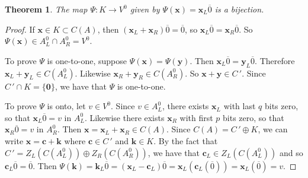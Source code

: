 \documentclass[12pt,twoside,singlespace]{article}
\numberwithin{equation}{section}
\newtheorem{thm}[equation]{Theorem}
\theoremstyle{definition}
\renewcommand{\vec}[1]{\mathbf{#1}}
\begin{document}
\begin{thm}
\label{thm:kv0}
The map $\Psi:K\to V^0$
given by $\Psi(\vec{x})=\vec{x}_L\overline{0}$ is a bijection.
\end{thm}
\begin{proof}
If $\vec{x}\in K\subset C(A)$, then $(\vec{x}_L+\vec{x}_R)\overline{0}=\overline{0}$, so $\vec{x}_L\overline{0}=\vec{x}_R\overline{0}$.  So $\Psi(\vec{x})\in A_L^0\cap A_R^0=V^0$.

To prove $\Psi$ is one-to-one, suppose $\Psi(\vec{x})=\Psi(\vec{y})$.  Then $\vec{x}_L\overline{0}=\vec{y}_L\overline{0}$.  Therefore $\vec{x}_L+\vec{y}_L\in C(A_L^0)$.  Likewise $\vec{x}_R+\vec{y}_R\in C(A_R^0)$.  So $\vec{x}+\vec{y}\in C\,'$.  Since $C\,'\cap K=\{\vec{0}\}$, we have that $\Psi$ is one-to-one.

To prove $\Psi$ is onto, let $v\in V^0$.  Since $v\in A_L^0$, there exists $\vec{x}_L$ with last $q$ bits zero, so that $\vec{x}_L\overline{0}=v$ in $A_L^0$.  Likewise there exists $\vec{x}_R$ with first $p$ bits zero, so that $\vec{x}_R\overline{0}=v$ in $A_R^0$.  Then $\vec{x}=\vec{x}_L+\vec{x}_R\in C(A)$.  Since $C(A)=C\,'\oplus K$, we can write $\vec{x}=\vec{c}+\vec{k}$ where $\vec{c}\in C\,'$ and $\vec{k}\in K$.  By the fact that $C\,'=Z_L(C(A_L^0))\oplus Z_R(C(A_R^0))$, we have that $\vec{c}_L\in Z_L(C(A_L^0))$ and so $\vec{c}_L\overline{0}=\overline{0}$.  Then
$\Psi(\vec{k})=\vec{k}_L\overline{0}
=(\vec{x}_L-\vec{c}_L)\overline{0}
=\vec{x}_L(\vec{c}_L(\overline{0}))
=\vec{x}_L(\overline{0})
=v.$
\end{proof}
\end{document}
